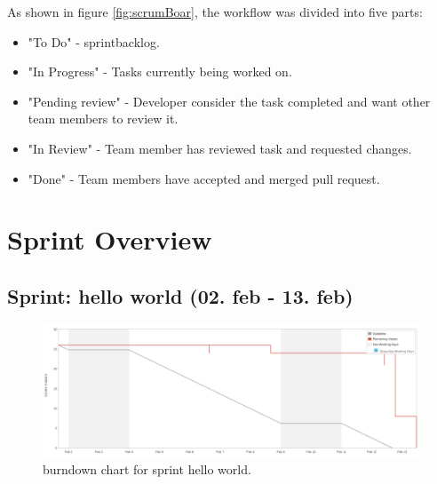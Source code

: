 As shown in figure \ref{fig:scrumBoar}, the workflow was divided into five parts:

\begin{itemize}
    \item "To Do" - \Gls{sprintbacklog}.
    \item "In Progress" - Tasks currently being worked on.
    \item "Pending review" - Developer consider the task completed and want other team members to review it.
    \item "In Review" - Team member has reviewed task and requested changes.
    \item "Done" - Team members have accepted and merged pull request.
\end{itemize}

\section{Sprint Overview}
\subsection{Sprint: hello world (02. feb - 13. feb)}
\begin{figure}[H] 
    \includegraphics[width=\textwidth]{inc/images/sprints/sprintHelloWorld020219-130219.png}
    \caption{\Gls{burndown} chart for \gls{sprint} hello world.}
    \label{fig:sprintHellWorld}
\end{figure}



